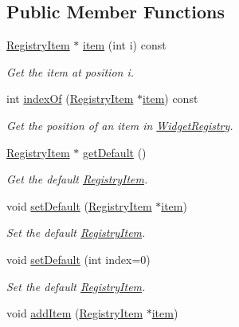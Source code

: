 \subsection*{Public Member Functions}
\begin{DoxyCompactItemize}
\item 
\hyperlink{class_registry_item}{Registry\+Item} $\ast$ \hyperlink{class_widget_registry_a432f0e1f366c3d5dce760e83fd8260fe}{item} (int i) const
\begin{DoxyCompactList}\small\item\em Get the item at position i. \end{DoxyCompactList}\item 
int \hyperlink{class_widget_registry_aa0855242e9b8aa7ec76cace984c26e57}{index\+Of} (\hyperlink{class_registry_item}{Registry\+Item} $\ast$\hyperlink{class_widget_registry_a432f0e1f366c3d5dce760e83fd8260fe}{item}) const
\begin{DoxyCompactList}\small\item\em Get the position of an item in \hyperlink{class_widget_registry}{Widget\+Registry}. \end{DoxyCompactList}\item 
\hyperlink{class_registry_item}{Registry\+Item} $\ast$ \hyperlink{class_widget_registry_a0841639b77ada4dc770886fea9fef193}{get\+Default} ()
\begin{DoxyCompactList}\small\item\em Get the default \hyperlink{class_registry_item}{Registry\+Item}. \end{DoxyCompactList}\item 
void \hyperlink{class_widget_registry_aa77ed2504c7e241eabf49ff4e1088fa2}{set\+Default} (\hyperlink{class_registry_item}{Registry\+Item} $\ast$\hyperlink{class_widget_registry_a432f0e1f366c3d5dce760e83fd8260fe}{item})
\begin{DoxyCompactList}\small\item\em Set the default \hyperlink{class_registry_item}{Registry\+Item}. \end{DoxyCompactList}\item 
void \hyperlink{class_widget_registry_a3d0fa9207009556d5218a3dda73349d0}{set\+Default} (int index=0)
\begin{DoxyCompactList}\small\item\em Set the default \hyperlink{class_registry_item}{Registry\+Item}. \end{DoxyCompactList}\item 
void \hyperlink{class_widget_registry_a53de88d7a538a8a6bbbcca4328abb480}{add\+Item} (\hyperlink{class_registry_item}{Registry\+Item} $\ast$\hyperlink{class_widget_registry_a432f0e1f366c3d5dce760e83fd8260fe}{item})

\end{DoxyCompactItemize}
